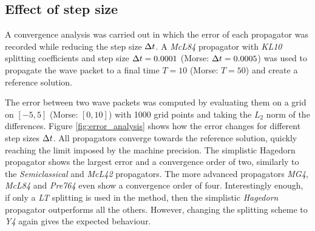 \subsection{Effect of step size}
\label{subsec:convergence}
%
A convergence analysis was carried out in which the error of each propagator was recorded while reducing the step size $\Delta t$.
A \emph{McL84} propagator with \emph{KL10} splitting coefficients and step size $\Delta t = 0.0001$ (Morse: $\Delta t = 0.0005$) was used to propagate the wave packet to a final time $T = 10$ (Morse: $T=50$) and create a reference solution.
\par\medskip
%
The error between two wave packets was computed by evaluating them on a grid on $[-5,5]$ (Morse: $[0,10]$) with 1000 grid points and taking the $L_2$ norm of the differences.
Figure \ref{fig:error_analysis} shows how the error changes for different step sizes $\Delta t$.
All propagators converge towards the reference solution, quickly reaching the limit imposed by the machine precision.
The simplistic Hagedorn propagator shows the largest error and a convergence order of two, similarly to the \emph{Semiclassical} and \emph{McL42} propagators.
The more advanced propagators \emph{MG4}, \emph{McL84} and \emph{Pre764} even show a convergence order of four.
Interestingly enough, if only a \emph{LT} splitting is used in the  method, then the simplistic \emph{Hagedorn} propagator outperforms all the others. However, changing the splitting scheme to \emph{Y4} again gives the expected behaviour.
%
